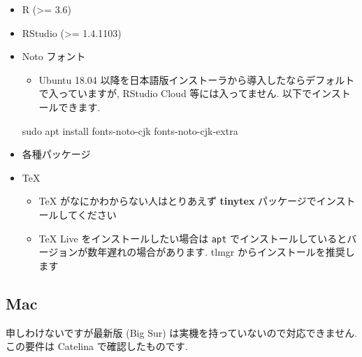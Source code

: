 \documentclass[
]{ltjsarticle}
\newenvironment{Shaded}{\begin{snugshade}}{\end{snugshade}}
\newcommand{\FunctionTok}[1]{\textcolor[rgb]{0.00,0.00,0.00}{#1}}
\newcommand{\NormalTok}[1]{#1}
\providecommand{\tightlist}{%
  \setlength{\itemsep}{0pt}\setlength{\parskip}{0pt}}
\begin{document}
\begin{itemize}
\tightlist
\item
  R (\textgreater= 3.6)
\item
  RStudio (\textgreater= 1.4.1103)
\item
  Noto フォント

  \begin{itemize}
  \tightlist
  \item
    Ubuntu 18.04 以降を日本語版インストーラから導入したならデフォルトで入っていますが, RStudio Cloud 等には入ってません. 以下でインストールできます.
  \end{itemize}

\begin{Shaded}
\begin{Highlighting}[]
\FunctionTok{sudo}\NormalTok{ apt install fonts{-}noto{-}cjk fonts{-}noto{-}cjk{-}extra}
\end{Highlighting}
\end{Shaded}
\item
  各種パッケージ
\item
  TeX

  \begin{itemize}
  \tightlist
  \item
    TeX がなにかわからない人はとりあえず \textbf{tinytex} パッケージでインストールしてください
  \item
    TeX Live をインストールしたい場合は \texttt{apt} でインストールしているとバージョンが数年遅れの場合があります. tlmgr からインストールを推奨します
  \end{itemize}
\end{itemize}

\hypertarget{mac}{%
\subsection{Mac}\label{mac}}

申しわけないですが最新版 (Big Sur) は実機を持っていないので対応できません. この要件は Catelina で確認したものです.
\end{document}
